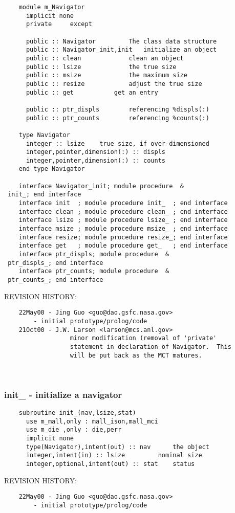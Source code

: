\begin{verbatim} 
    module m_Navigator
      implicit none
      private	  except
 
      public :: Navigator		  The class data structure
      public :: Navigator_init,init	  initialize an object
      public :: clean			  clean an object
      public :: lsize			  the true size
      public :: msize			  the maximum size
      public :: resize			  adjust the true size
      public :: get			  get an entry
 
      public :: ptr_displs		  referencing %displs(:)
      public :: ptr_counts		  referencing %counts(:)
 
    type Navigator
      integer :: lsize	  true size, if over-dimensioned
      integer,pointer,dimension(:) :: displs
      integer,pointer,dimension(:) :: counts
    end type Navigator
 
    interface Navigator_init; module procedure	&
 init_; end interface
    interface init  ; module procedure init_  ; end interface
    interface clean ; module procedure clean_ ; end interface
    interface lsize ; module procedure lsize_ ; end interface
    interface msize ; module procedure msize_ ; end interface
    interface resize; module procedure resize_; end interface
    interface get   ; module procedure get_   ; end interface
    interface ptr_displs; module procedure	&
 ptr_displs_; end interface
    interface ptr_counts; module procedure	&
 ptr_counts_; end interface
 \end{verbatim}{\sf REVISION HISTORY:}
\begin{verbatim}  	22May00	- Jing Guo <guo@dao.gsfc.nasa.gov>
 		- initial prototype/prolog/code
  	21Oct00	- J.W. Larson <larson@mcs.anl.gov>
                  minor modification (removal of 'private' 
                  statement in declaration of Navigator.  This
                  will be put back as the MCT matures.\end{verbatim}
 
 
\mbox{}\hrulefill\ 
 

 \subsubsection{init\_ - initialize a navigator}


 
 
\begin{verbatim} 
    subroutine init_(nav,lsize,stat)
      use m_mall,only : mall_ison,mall_mci
      use m_die ,only : die,perr
      implicit none
      type(Navigator),intent(out) :: nav	  the object
      integer,intent(in) :: lsize		  nominal size
      integer,optional,intent(out) :: stat	  status
 \end{verbatim}{\sf REVISION HISTORY:}
\begin{verbatim}  	22May00	- Jing Guo <guo@dao.gsfc.nasa.gov>
 		- initial prototype/prolog/code\end{verbatim}
 
